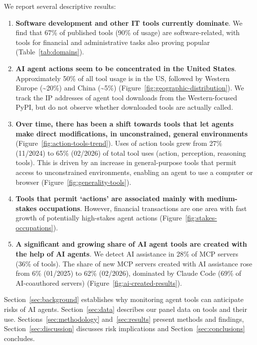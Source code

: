 \documentclass[manuscript,screen,nonacm,oneside]{acmart}
\begin{document}
We report several descriptive results:

\begin{enumerate}
\def\labelenumi{\arabic{enumi}.}
\item
 \textbf{Software development and other IT tools currently dominate}. We find that 67\% of published tools (90\% of usage) are software-related, with tools for financial and administrative tasks also proving popular (Table~\ref{tab:domains}).
\item
 \textbf{AI agent actions seem to be concentrated in the United States}. Approximately 50\% of all tool usage is in the US, followed by Western Europe (\textasciitilde20\%) and China (\textasciitilde5\%) (Figure~\ref{fig:geographic-distribution}). We track the IP addresses of agent tool downloads from the Western-focused PyPI, but do not observe whether downloaded tools are actually called.
\item
 \textbf{Over time, there has been a shift towards tools that let agents make direct modifications, in unconstrained, general environments} (Figure~\ref{fig:action-tools-trend}). Uses of action tools grew from 27\% (11/2024) to 65\% (02/2026) of total tool uses (action, perception, reasoning tools). This is driven by an increase in general-purpose tools that permit access to unconstrained environments, enabling an agent to use a computer or browser (Figure~\ref{fig:generality-tools}).
\item
 \textbf{Tools that permit `actions' are associated mainly with medium-stakes occupations}. However, financial transactions are one area with fast growth of potentially high-stakes agent actions (Figure~\ref{fig:stakes-occupations}).
\item
 \textbf{A significant and growing share of AI agent tools are created with the help of AI agents}. We detect AI assistance in 28\% of MCP servers (36\% of tools). The share of new MCP servers created with AI assistance rose from 6\% (01/2025) to 62\% (02/2026), dominated by Claude Code (69\% of AI-coauthored servers) (Figure~\ref{fig:ai-created-results}).
\end{enumerate}

Section~\ref{sec:background} establishes why monitoring agent tools can anticipate risks of AI agents. Section~\ref{sec:data} describes our panel data on tools and their use. Sections~\ref{sec:methodology} and~\ref{sec:results} present methods and findings, Section~\ref{sec:discussion} discusses risk implications and Section~\ref{sec:conclusions} concludes.
\end{document}
